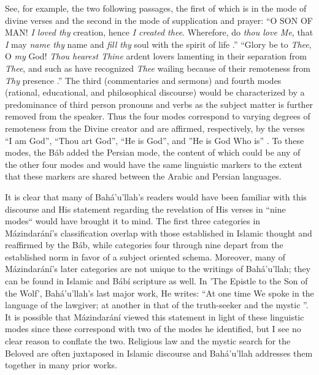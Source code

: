 \documentclass[12pt, oneside]{report}
\begin{document}
See, for example, the two following passages, the first of which is in the mode of divine verses and the second in the mode of supplication and prayer: ``O SON OF MAN! \emph{I loved thy} creation, hence \emph{I created thee}. Wherefore, do \emph{thou love Me}, that \emph{I} may \emph{name thy} name and \emph{fill thy} soul with the spirit of life \cite{bahaullah_hidden_2002}.'' ``Glory be to \emph{Thee}, O \emph{my} God!  \emph{Thou hearest Thine} ardent lovers lamenting in their separation from \emph{Thee}, and such as have recognized \emph{Thee} wailing because of their remoteness from \emph{Thy} presence \cite{bahaullah_prayers_1987}.''
The third (commentaries and sermons) and fourth modes (rational, educational, and philosophical discourse) would be characterized by a predominance of third person pronouns and verbs as the subject matter is further removed from the speaker.
Thus the four modes correspond to varying degrees of remoteness from the Divine creator and are affirmed, respectively, by the verses ``I am God'', ``Thou art God'', ``He is God'', and ''He is God Who is'' \cite{saiedi_gate_2008}.
To these modes, the B\'{a}b added the Persian mode, the content of which could be any of the other four modes \cite{saiedi_gate_2008} and would have the same linguistic markers to the extent that these markers are shared between the Arabic and Persian languages.
\par
It is clear that many of Bah\'{a}'u'llah's readers would have been familiar with this discourse and His statement regarding the revelation of His verses in ``nine modes`` would have brought it to mind.
The first three categories in M\'{a}zindar\'{a}n\'{i}'s classification overlap with those established in Islamic thought and reaffirmed by the B\'{a}b, while categories four through nine depart from the established norm in favor of a subject oriented schema.
Moreover, many of M\'{a}zindar\'{a}n\'{i}'s later categories are not unique to the writings of Bah\'{a}'u'llah; they can be found in Islamic and B\'{a}b\'{i} scripture as well.
In 'The Epistle to the Son of the Wolf', Bah\'{a}'u'llah's last major work, He writes: “At one time We spoke in the language of the lawgiver; at another in that of the truth-seeker and the mystic \cite{bahaullah_epistle_nodate}”.
It is possible that M\'{a}zindar\'{a}n\'{i} viewed this statement in light of these linguistic modes since these correspond with two of the modes he identified, but I see no clear reason to conflate the two.
Religious law and the mystic search for the Beloved are often juxtaposed in Islamic discourse and Bah\'{a}'u'llah addresses them together in many prior works.
\end{document}
